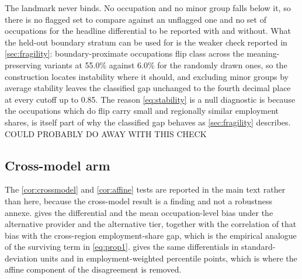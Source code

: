The landmark never binds. No occupation and no minor group falls below it, so there is no flagged set to compare against an unflagged one and no set of occupations for the headline differential to be reported with and without. What the held-out boundary stratum can be used for is the weaker check reported in \cref{sec:fragility}: boundary-proximate occupations flip class across the meaning-preserving variants at 55.0\% against 6.0\% for the randomly drawn ones, so the construction locates instability where it should, and excluding minor groups by average stability leaves the classified gap unchanged to the fourth decimal place at every cutoff up to 0.85. The reason \cref{eq:stability} is a null diagnostic is because the occupations which do flip carry small and regionally similar employment shares, is itself part of why the classified gap behaves as \cref{sec:fragility} describes. COULD PROBABLY DO AWAY WITH THIS CHECK


\subsection{Cross-model arm}

The \cref{cor:crossmodel} and \cref{cor:affine} tests are reported in the main text rather than here, because the cross-model result is a finding and not a robustness annexe.  gives the differential and the mean occupation-level bias under the alternative provider and the alternative tier, together with the correlation of that bias with the cross-region employment-share gap, which is the empirical analogue of the surviving term in \cref{eq:prop1}.  gives the same differentials in standard-deviation units and in employment-weighted percentile points, which is where the affine component of the disagreement is removed.